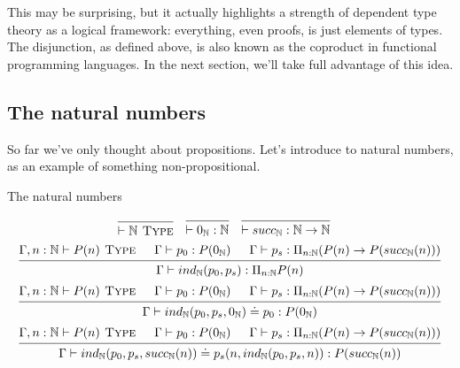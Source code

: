 \documentclass[a4paper, 12pt]{article}
\newcommand{\N}{\mathbb{N}}
\newcommand{\type}{\textsc{ Type}}
\theoremstyle{changedot}
\theoremstyle{changedotbreak}
\theoremstyle{nonumberplain}
\begin{document}
This may be surprising, but it actually highlights a strength of dependent type theory as a logical framework: everything, even proofs, is just elements of types. The disjunction, as defined above, is also known as the coproduct in functional programming languages. In the next section, we'll take full advantage of this idea.

\subsection{The natural numbers}
So far we've only thought about propositions. Let's introduce to natural numbers, as an example of something non-propositional.

\begin{definition}
  The natural numbers

\begin{align*}
 &\begin{prooftree}
    \infer0{\vdash \N \type}
  \end{prooftree}
   &
  &\begin{prooftree}
    \infer0{\vdash 0_{\N} : \N}
    \end{prooftree}
    &
    &\begin{prooftree}
      \infer0{\vdash succ_{\N} : \N \to \N}
    \end{prooftree}
\end{align*}
\begin{align*}
  \begin{prooftree}
    \hypo{\Gamma, n : \N \vdash P(n) \type}
    \hypo{\Gamma \vdash p_{0} : P(0_{\N})}
    \hypo{\Gamma \vdash p_{s} : \Pi_{n:\N} (P(n) \to P(succ_{\N}(n)))}
    \infer3{\Gamma \vdash ind_{\N}(p_{0}, p_{s}) : \Pi_{n:\N} P(n)}
  \end{prooftree}
\end{align*}
\begin{align*}
  \begin{prooftree}
      \hypo{\Gamma, n : \N \vdash P(n) \type}
      \hypo{\Gamma \vdash p_{0} : P(0_{\N})}
      \hypo{\Gamma \vdash p_{s} : \Pi_{n:\N} (P(n) \to P(succ_{\N}(n)))}
      \infer3{\Gamma \vdash ind_{\N}(p_{0}, p_{s}, 0_{\N}) \doteq p_{0} : P(0_{\N})}
  \end{prooftree}
\end{align*}
\begin{align*}
  \begin{prooftree}
      \hypo{\Gamma, n : \N \vdash P(n) \type}
      \hypo{\Gamma \vdash p_{0} : P(0_{\N})}
      \hypo{\Gamma \vdash p_{s} : \Pi_{n:\N} (P(n) \to P(succ_{\N}(n)))}
      \infer3{\Gamma \vdash ind_{\N}(p_{0}, p_{s}, succ_{\N}(n)) \doteq p_{s}(n, ind_{\N}(p_{0}, p_{s}, n)) : P(succ_{\N}(n))}
  \end{prooftree}
\end{align*}
\end{definition}
\end{document}
